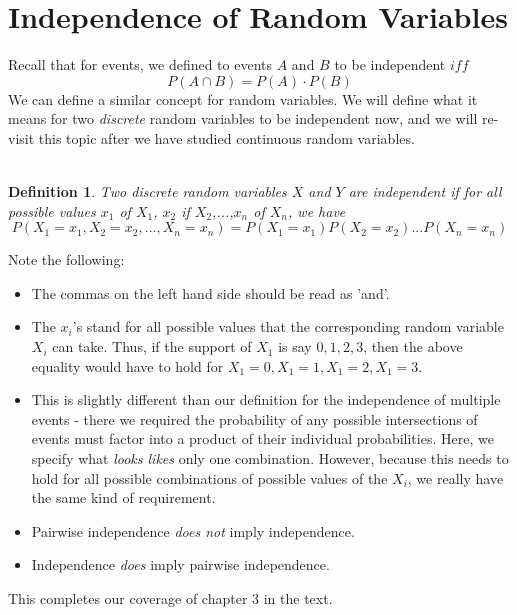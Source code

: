 \documentclass[12pt]{article} %
\newtheorem{defn}{Definition}
\begin{document}
\section{Independence of Random Variables}
Recall that for events, we defined to events $A$ and $B$ to be independent $iff$
$$P(A\cap B) = P(A)\cdot P(B)$$
We can define a similar concept for random variables. We will define what it means for two \emph{discrete} random variables to be independent now, and we will re-visit this topic after we have studied continuous random variables.\\\\
\begin{defn}
Two discrete random variables $X$ and $Y$ are independent if for all possible values $x_1$ of $X_1$, $x_2$ if $X_2$,...,$x_n$ of $X_n$, we have
$$P(X_1=x_1, X_2=x_2, ...,X_n=x_n) = P(X_1=x_1)P(X_2=x_2)...P(X_n=x_n)$$
\end{defn}
Note the following:
\begin{itemize}
\item The commas on the left hand side should be read as 'and'.
\item The $x_i$'s stand for all possible values that the corresponding random variable $X_i$ can take. Thus, if the support of $X_1$ is say $0,1,2,3$, then the above equality would have to hold for $X_1=0,X_1=1,X_1=2,X_1=3$.
\item  This is slightly different than our definition for the independence of multiple events - there we required the probability of any possible intersections of events must factor into a product of their individual probabilities. Here, we specify what \emph{looks likes} only one combination. However, because this needs to hold for all possible combinations of possible values of the $X_i$, we really have the same kind of requirement.
\item Pairwise independence \emph{does not} imply independence.
\item Independence \emph{does} imply pairwise independence.
\end{itemize}
This completes our coverage of chapter 3 in the text. 
\end{document}
